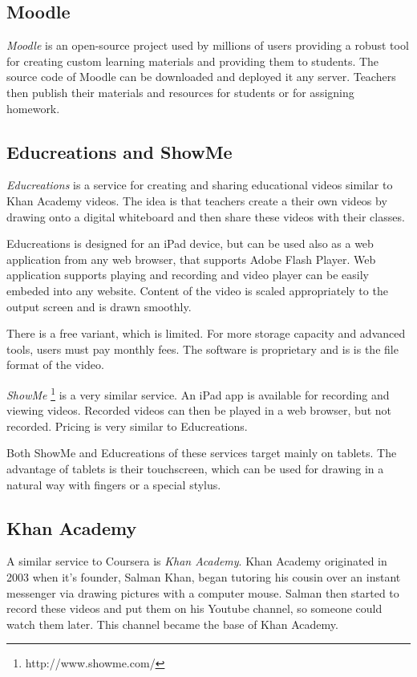 \subsection{Moodle}
\textit{Moodle} \cite{7} is an open-source project used by millions of users \cite{8} providing a robust tool for creating custom learning materials and providing them to students. The source code of Moodle can be downloaded and deployed it any server. Teachers then publish their materials and resources for students or for assigning homework.




\subsection{Educreations and ShowMe}
\textit{Educreations} is a service for creating and sharing educational videos similar to Khan Academy videos. The idea is that teachers create a their own videos by drawing onto a digital whiteboard and then share these videos with their classes.

Educreations is designed for an iPad device, but can be used also as a web application from any web browser, that supports Adobe Flash Player. Web application supports playing and recording and video player can be easily embeded into any website. Content of the video is scaled appropriately to the output screen and is drawn smoothly.

There is a free variant, which is limited. For more storage capacity and advanced tools, users must pay monthly fees. The software is proprietary and is is the file format of the video.

\textit{ShowMe} \footnote{http://www.showme.com/} is a very similar service. An iPad app is available for recording and viewing videos. Recorded videos can then be played in a web browser, but not recorded. Pricing is very similar to Educreations.

Both ShowMe and Educreations of these services target mainly on tablets. The advantage of tablets is their touchscreen, which can be used for drawing in a natural way with fingers or a special stylus.



\subsection{Khan Academy}
A similar service to Coursera is \textit{Khan Academy}. Khan Academy originated in 2003 when it's founder, Salman Khan, began tutoring his cousin over an instant messenger via drawing pictures with a computer mouse. Salman then started to record these videos and put them on his Youtube channel, so someone could watch them later. This channel became the base of Khan Academy.

